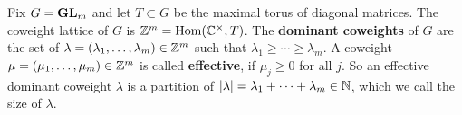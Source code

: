 \documentclass[draft]{article}
\begin{document}
Fix $G = {\mathbf{GL}}_m$ and let $T\subset G$ be the maximal torus of diagonal matrices. 
The coweight lattice of $ G $ is $ \mathbb Z^m = \operatorname{Hom}(\mathbb C^\times,T)$.
% 
The \textbf{dominant coweights} of $ G $ 
are the set of $ \lambda = (\lambda_1, \dots, \lambda_m) \in \mathbb Z^m $ such that $ \lambda_1 \ge \cdots \ge \lambda_m$. 
% 
A coweight $ \mu = (\mu_1, \dots, \mu_m) \in \mathbb Z^m$ is called \textbf{effective}, if $ \mu_j \ge 0 $ for all $ j$.
% 
So an effective dominant coweight $ \lambda $ is a partition of $|\lambda| = \lambda_1 + \cdots + \lambda_m\in\mathbb N$, which we call the size of $ \lambda$.
% 
% 
% 
% 
\end{document}

